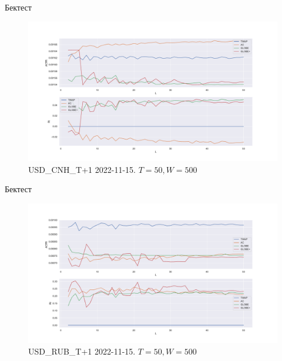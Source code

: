 \documentclass[aspectratio=169]{beamer}
\begin{document}
        \begin{frame}{Бектест}
        
            \begin{figure}  
                \centering
                \includegraphics[width=0.83\linewidth]{USD_CNH_T+1 2022-11-15 T = 50 W = 500}
                \caption{USD\_CNH\_T+1 2022-11-15. $T = 50, W = 500$}
            \end{figure}

        \end{frame}

        \begin{frame}{Бектест}
        
            \begin{figure}  
                \centering
                \includegraphics[width=0.83\linewidth]{USD_RUB_T+1 2022-10-20 T = 50 W = 500}
                \caption{USD\_RUB\_T+1 2022-11-15. $T = 50, W = 500$}
            \end{figure}

        \end{frame}
\end{document}
